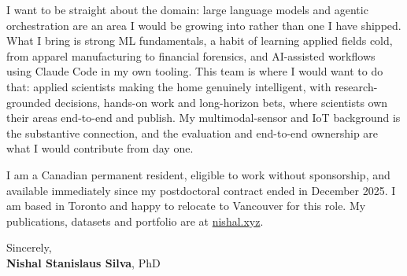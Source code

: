 \documentclass[11pt]{article}
\newcommand{\clName}{Nishal Stanislaus Silva}
\newcommand{\clSite}{https://nishal.xyz}
\begin{document}
I want to be straight about the domain: large language models and agentic orchestration are an area I would be growing into rather than one I have shipped. What I bring is strong ML fundamentals, a habit of learning applied fields cold, from apparel manufacturing to financial forensics, and AI-assisted workflows using Claude Code in my own tooling. This team is where I would want to do that: applied scientists making the home genuinely intelligent, with research-grounded decisions, hands-on work and long-horizon bets, where scientists own their areas end-to-end and publish. My multimodal-sensor and IoT background is the substantive connection, and the evaluation and end-to-end ownership are what I would contribute from day one.

I am a Canadian permanent resident, eligible to work without sponsorship, and available immediately since my postdoctoral contract ended in December 2025. I am based in Toronto and happy to relocate to Vancouver for this role. My publications, datasets and portfolio are at \href{\clSite}{nishal.xyz}.

\vspace{10pt}
Sincerely,\\[2pt]
\textbf{\clName}, PhD
\end{document}
